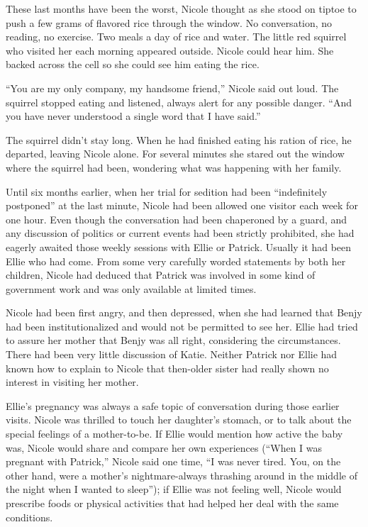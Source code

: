 \documentclass[]{article}
\begin{document}
{{These last months have been the worst, Nicole thought as she stood on tiptoe to push a few grams of flavored rice through the window. No conversation, no reading, no exercise. Two meals a day of rice and water. The little red squirrel who visited her each morning appeared outside. Nicole could hear him. She backed across the cell so she could see him eating the rice.

“You are my only company, my handsome friend,” Nicole said out loud. The squirrel stopped eating and listened, always alert for any possible danger. “And you have never understood a single word that I have said.”

The squirrel didn’t stay long. When he had finished eating his ration of rice, he departed, leaving Nicole alone. For several minutes she stared out the window where the squirrel had been, wondering what was happening with her family.

Until six months earlier, when her trial for sedition had been “indefinitely postponed” at the last minute, Nicole had been allowed one visitor each week for one hour. Even though the conversation had been chaperoned by a guard, and any discussion of politics or current events had been strictly prohibited, she had eagerly awaited those weekly sessions with Ellie or Patrick. Usually it had been Ellie who had come. From some very carefully worded statements by both her children, Nicole had deduced that Patrick was involved in some kind of government work and was only available at limited times.

Nicole had been first angry, and then depressed, when she had learned that Benjy had been institutionalized and would not be permitted to see her. Ellie had tried to assure her mother that Benjy was all right, considering the circumstances. There had been very little discussion of Katie. Neither Patrick nor Ellie had known how to explain to Nicole that then-older sister had really shown no interest in visiting her mother.

Ellie’s pregnancy was always a safe topic of conversation during those earlier visits. Nicole was thrilled to touch her daughter’s stomach, or to talk about the special feelings of a mother-to-be. If Ellie would mention how active the baby was, Nicole would share and compare her own experiences (“When I was pregnant with Patrick,” Nicole said one time, “I was never tired. You, on the other hand, were a mother’s nightmare-always thrashing around in the middle of the night when I wanted to sleep”); if Ellie was not feeling well, Nicole would prescribe foods or physical activities that had helped her deal with the same conditions.

}}
\end{document}
